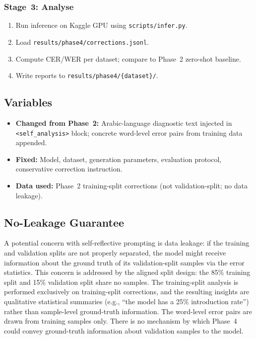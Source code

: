 \subsubsection{Stage~3: Analyse}

\begin{enumerate}
  \item Run inference on Kaggle GPU using \texttt{scripts/infer.py}.
  \item Load \texttt{results/phase4/corrections.jsonl}.
  \item Compute CER/WER per dataset; compare to Phase~2 zero-shot baseline.
  \item Write reports to \texttt{results/phase4/\{dataset\}/}.
\end{enumerate}

\subsection{Variables}
\begin{itemize}
  \item \textbf{Changed from Phase~2:} Arabic-language diagnostic text
        injected in \texttt{<self\_analysis>} block; concrete word-level
        error pairs from training data appended.
  \item \textbf{Fixed:} Model, dataset, generation parameters, evaluation
        protocol, conservative correction instruction.
  \item \textbf{Data used:} Phase~2 training-split corrections (not
        validation-split; no data leakage).
\end{itemize}

\subsection{No-Leakage Guarantee}

A potential concern with self-reflective prompting is data leakage: if the
training and validation splits are not properly separated, the model might
receive information about the ground truth of its validation-split samples
via the error statistics. This concern is addressed by the aligned split
design: the 85\% training split and 15\% validation split share no samples.
The training-split analysis is performed exclusively on training-split
corrections, and the resulting insights are qualitative statistical summaries
(e.g., ``the model has a 25\% introduction rate'') rather than sample-level
ground-truth information. The word-level error pairs are drawn from training
samples only. There is no mechanism by which Phase~4 could convey
ground-truth information about validation samples to the model.

